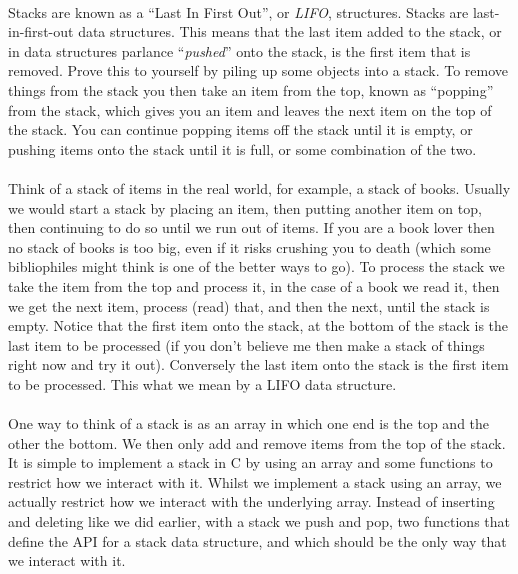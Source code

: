 \documentclass[10pt, a4paper, twosize]{article}
\begin{document}
\paragraph{} Stacks are known as a ``Last In First Out'', or \emph{LIFO}, structures. Stacks are last-in-first-out data structures. This means that the last item added to the stack, or in data structures parlance ``\emph{pushed}'' onto the stack, is the first item that is removed. Prove this to yourself by piling up some objects into a stack. To remove things from the stack you then take an item from the top, known as ``popping'' from the stack, which gives you an item and leaves the next item on the top of the stack. You can continue popping items off the stack until it is empty, or pushing items onto the stack until it is full, or some combination of the two.

\paragraph{} Think of a stack of items in the real world, for example, a stack of books. Usually we would start a stack by placing an item, then putting another item on top, then continuing to do so until we run out of items. If you are a book lover then no stack of books is too big, even if it risks crushing you to death (which some bibliophiles might think is one of the better ways to go). To process the stack we take the item from the top and process it, in the case of a book we read it, then we get the next item, process (read) that, and then the next, until the stack is empty. Notice that the first item onto the stack, at the bottom of the stack is the last item to be processed (if you don't believe me then make a stack of things right now and try it out). Conversely the last item onto the stack is the first item to be processed. This what we mean by a LIFO data structure.

\paragraph{} One way to think of a stack is as an array in which one end is the top and the other the bottom. We then only add and remove items from the top of the stack.  It is simple to implement a stack in C by using an array and some functions to restrict how we interact with it. Whilst we implement a stack using an array, we actually restrict how we interact with the underlying array. Instead of inserting and deleting like we did earlier, with a stack we push and pop, two functions that define the API for a stack data structure, and which should be the only way that we interact with it.
\end{document}
